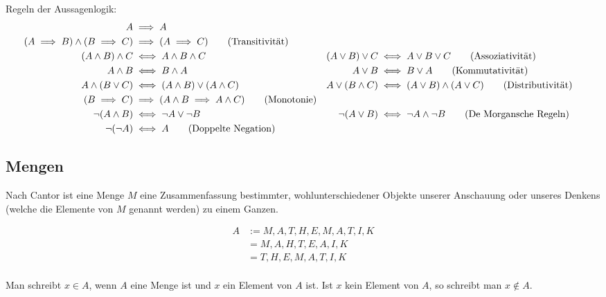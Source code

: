 \begin{theorem}
  Regeln der Aussagenlogik:
  \begin{align*}
    A &\implies A \\
    (A \implies B) \wedge (B \implies C) &\implies (A \implies C) \tag{Transitivität\index{Aussage!Transitivität}} \\
    (A \wedge B) \wedge C &\iff A \wedge B \wedge C & (A \vee B) \vee C &\iff A \vee B \vee C \tag{Assoziativität\index{Aussage!Assoziativgesetz}} \\
    A \wedge B &\iff B \wedge A & A \vee B &\iff B \vee A \tag{Kommutativität\index{Aussage!Kommutativgesetz}} \\
    A \wedge (B \vee C) &\iff (A \wedge B) \vee (A \wedge C) & A \vee (B \wedge C) &\iff (A \vee B) \wedge (A \vee C) \tag{Distributivität\index{Aussage!Distributivgesetz}} \\
    (B \implies C) &\implies (A \wedge B \implies A \wedge C) \tag{Monotonie\index{Aussage!Monotonie}} \\
    \neg (A \wedge B) &\iff \neg A \vee \neg B & \neg (A \vee B) &\iff \neg A \wedge \neg B \tag{De Morgansche Regeln\index{Aussage!De Morgansche Regeln}} \\
    \neg (\neg A) &\iff A \tag{Doppelte Negation\index{Aussage!Doppelte Negation}}
  \end{align*}
\end{theorem}

\subsection{Mengen}
Nach Cantor ist eine Menge $M$ eine Zusammenfassung bestimmter, wohlunterschiedener Objekte unserer Anschauung oder unseres Denkens (welche die Elemente von $M$ genannt werden) zu einem Ganzen.

\begin{example}
  \begin{align*}
    A &:= {M, A, T, H, E, M, A, T, I, K} \\
    \, &= {M, A, H, T, E, A, I, K} \\
    \, &= {T, H, E, M, A, T, I, K} \\
  \end{align*}
\end{example}

Man schreibt $x \in A$\index[sym]{$\in$}, wenn $A$ eine Menge ist und $x$ ein Element von $A$ ist. Ist $x$ kein Element von $A$, so schreibt man $x \not\in A$.

